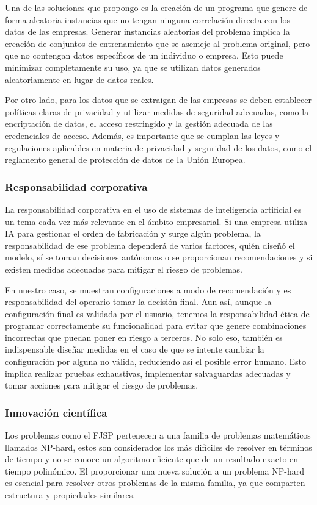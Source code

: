 Una de las soluciones que propongo es la creación de un programa que genere de forma 
aleatoria instancias que no tengan ninguna correlación directa con los datos de las 
empresas. Generar instancias aleatorias del problema implica la creación de conjuntos 
de entrenamiento que se asemeje al problema original, pero que no contengan datos 
específicos de un individuo o empresa. Esto puede minimizar completamente su uso, ya 
que se utilizan datos generados aleatoriamente en lugar de datos reales.\medskip

Por otro lado, para los datos que se extraigan de las empresas se deben establecer 
políticas claras de privacidad y utilizar medidas de seguridad adecuadas, como 
la encriptación de datos, el acceso restringido y la gestión adecuada de las 
credenciales de acceso. Además, es importante que se cumplan las leyes y 
regulaciones aplicables en materia de privacidad y seguridad de los datos, como 
el reglamento general de protección de datos de la Unión Europea.\medskip

\subsubsection{Responsabilidad corporativa}
La responsabilidad corporativa en el uso de sistemas de inteligencia artificial 
es un tema cada vez más relevante en el ámbito empresarial. Si una empresa utiliza 
IA para gestionar el orden de fabricación y surge algún problema, la responsabilidad 
de ese problema dependerá de varios factores, quién diseñó el modelo, sí se toman 
decisiones autónomas o se proporcionan recomendaciones y si existen medidas adecuadas 
para mitigar el riesgo de problemas.\medskip

En nuestro caso, se muestran configuraciones a modo de recomendación y es responsabilidad 
del operario tomar la decisión final. Aun así, aunque la configuración final es validada 
por el usuario,  tenemos la responsabilidad ética de programar correctamente su funcionalidad 
para evitar que genere combinaciones incorrectas que puedan poner en riesgo a terceros. 
No solo eso, también es indispensable diseñar medidas en el caso de que se intente cambiar 
la configuración por alguna no válida, reduciendo así el posible error humano. Esto implica 
realizar pruebas exhaustivas, implementar salvaguardas adecuadas y tomar acciones para 
mitigar el riesgo de problemas. 

\subsubsection{Innovación científica}
Los problemas como el FJSP pertenecen a una familia de problemas matemáticos llamados NP-hard, 
estos son considerados los más difíciles de resolver en términos de tiempo y no se conoce un 
algoritmo eficiente que de un resultado exacto en tiempo polinómico. El proporcionar una nueva 
solución a un problema NP-hard es esencial para resolver otros problemas de la misma familia, 
ya que comparten estructura y propiedades similares.\medskip

